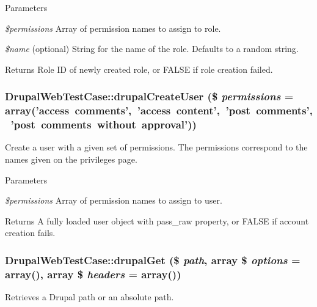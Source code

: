 \begin{DoxyParams}{Parameters}
\item[{\em \$permissions}]Array of permission names to assign to role. \item[{\em \$name}](optional) String for the name of the role. Defaults to a random string. \end{DoxyParams}
\begin{DoxyReturn}{Returns}
Role ID of newly created role, or FALSE if role creation failed. 
\end{DoxyReturn}
\hypertarget{class_drupal_web_test_case_ad39222df2e8243c419d465bbe48b0713}{
\subsubsection[{drupalCreateUser}]{\setlength{\rightskip}{0pt plus 5cm}DrupalWebTestCase::drupalCreateUser (\$ {\em permissions} = {\ttfamily array('access~comments',~'access~content',~'post~comments',~'post~comments~without~approval')})}}
\label{class_drupal_web_test_case_ad39222df2e8243c419d465bbe48b0713}
Create a user with a given set of permissions. The permissions correspond to the names given on the privileges page.


\begin{DoxyParams}{Parameters}
\item[{\em \$permissions}]Array of permission names to assign to user. \end{DoxyParams}
\begin{DoxyReturn}{Returns}
A fully loaded user object with pass\_\-raw property, or FALSE if account creation fails. 
\end{DoxyReturn}
\hypertarget{class_drupal_web_test_case_ae282e9e10195fb8dad8a49d1b35e31c9}{
\subsubsection[{drupalGet}]{\setlength{\rightskip}{0pt plus 5cm}DrupalWebTestCase::drupalGet (\$ {\em path}, \/  array \$ {\em options} = {\ttfamily array()}, \/  array \$ {\em headers} = {\ttfamily array()})}}
\label{class_drupal_web_test_case_ae282e9e10195fb8dad8a49d1b35e31c9}
Retrieves a Drupal path or an absolute path.


